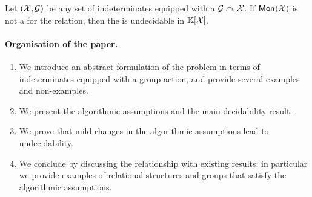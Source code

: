 \begin{conjecture}
    \label{lem:undecid-equiv-idl}
    Let $(\mathcal{X}, \mathcal{G})$ be any 
    set of indeterminates equipped with a  $\mathcal{G} \curvearrowright \mathcal{X}$. If 
    $\mathsf{Mon}_{}(\mathcal{X})$ is not a 
    for the  relation, then the  is undecidable in $\mathbb{K}[\mathcal{X}]$.
\end{conjecture}


\paragraph{Organisation of the paper.}
\begin{enumerate}
    \item We introduce an abstract formulation of the problem 
        in terms of indeterminates equipped with a group action, and
        provide several examples and non-examples.
    \item We present the algorithmic assumptions and the main decidability
        result.
    \item We prove that mild changes in the algorithmic assumptions
        lead to undecidability.
    \item We conclude by discussing the relationship with existing
        results: in particular we provide examples of relational
        structures and groups that satisfy the algorithmic assumptions.
\end{enumerate}
